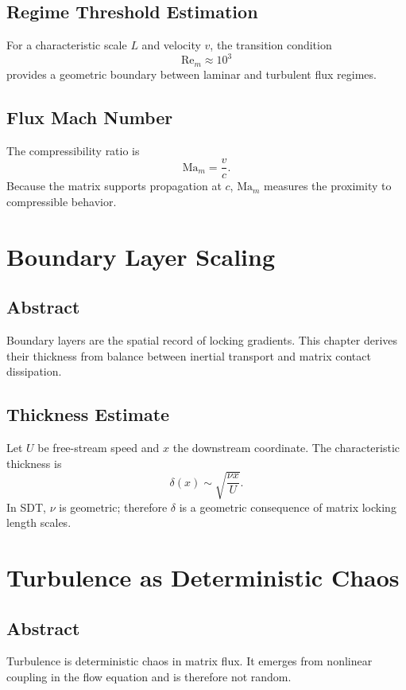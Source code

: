 \documentclass[12pt]{book}
\begin{document}
\section{Regime Threshold Estimation}
For a characteristic scale $L$ and velocity $v$, the transition condition
\begin{equation}
\mathrm{Re}_m \approx 10^3
\end{equation}
provides a geometric boundary between laminar and turbulent flux regimes.

\section{Flux Mach Number}
The compressibility ratio is
\begin{equation}
\mathrm{Ma}_m = \frac{v}{c}.
\end{equation}
Because the matrix supports propagation at $c$, $\mathrm{Ma}_m$ measures the proximity to compressible
behavior.

\chapter{Boundary Layer Scaling}

\section*{Abstract}
Boundary layers are the spatial record of locking gradients. This chapter derives their thickness from
balance between inertial transport and matrix contact dissipation.

\section{Thickness Estimate}
Let $U$ be free-stream speed and $x$ the downstream coordinate. The characteristic thickness is
\begin{equation}
\delta(x) \sim \sqrt{\frac{\nu x}{U}}.
\end{equation}
In SDT, $\nu$ is geometric; therefore $\delta$ is a geometric consequence of matrix locking length scales.

\chapter{Turbulence as Deterministic Chaos}

\section*{Abstract}
Turbulence is deterministic chaos in matrix flux. It emerges from nonlinear coupling in the flow equation
and is therefore not random.
\end{document}
